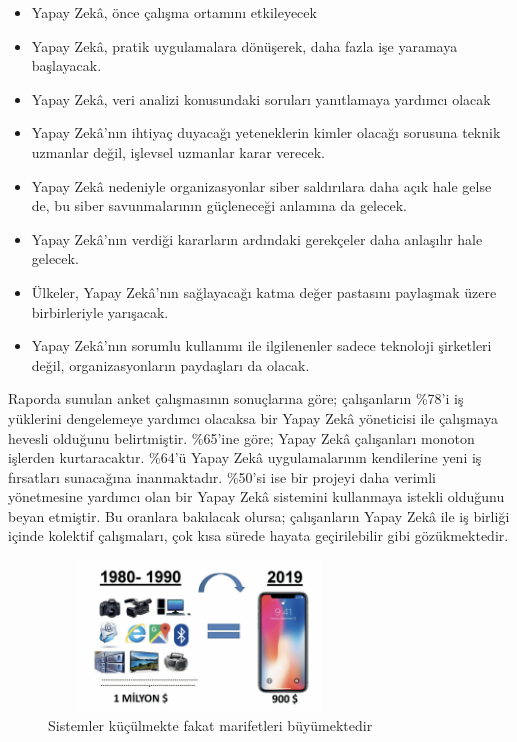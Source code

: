 \documentclass{article}
\begin{document}
\begin{itemize}
    \item Yapay Zekâ, önce çalışma ortamını etkileyecek
    \item Yapay Zekâ, pratik uygulamalara dönüşerek, daha fazla işe yaramaya başlayacak.
    \item Yapay Zekâ, veri analizi konusundaki soruları yanıtlamaya yardımcı olacak
    \item Yapay Zekâ’nın ihtiyaç duyacağı yeteneklerin kimler olacağı sorusuna teknik uzmanlar değil, işlevsel uzmanlar karar verecek.
    \item Yapay Zekâ nedeniyle organizasyonlar siber saldırılara daha açık hale gelse de,
bu siber savunmalarının güçleneceği anlamına da gelecek.
    \item Yapay Zekâ’nın verdiği kararların ardındaki gerekçeler daha anlaşılır hale gelecek.
    \item Ülkeler, Yapay Zekâ’nın sağlayacağı katma değer pastasını paylaşmak üzere birbirleriyle yarışacak.
    \item Yapay Zekâ’nın sorumlu kullanımı ile ilgilenenler sadece teknoloji şirketleri değil, organizasyonların paydaşları da olacak.
    
\end{itemize}

Raporda sunulan anket çalışmasının sonuçlarına göre; çalışanların \%78’i iş yüklerini dengelemeye yardımcı olacaksa bir Yapay Zekâ yöneticisi ile çalışmaya
hevesli olduğunu belirtmiştir. \%65’ine göre; Yapay Zekâ çalışanları monoton
işlerden kurtaracaktır. \%64’ü Yapay Zekâ uygulamalarının kendilerine yeni iş
fırsatları sunacağına inanmaktadır. \%50’si ise bir projeyi daha verimli yönetmesine yardımcı olan bir Yapay Zekâ sistemini kullanmaya istekli olduğunu beyan
etmiştir. Bu oranlara bakılacak olursa; çalışanların Yapay Zekâ ile iş birliği içinde
kolektif çalışmaları, çok kısa sürede hayata geçirilebilir gibi gözükmektedir.


\begin{figure}[h]
\centering
  \includegraphics[width=8cm, height=4cm]{ip.png}
  \caption{Sistemler küçülmekte fakat marifetleri büyümektedir \cite{ref5}}
\end{figure}
\end{document}
